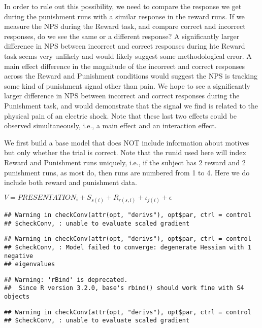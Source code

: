 \documentclass[]{article}
\begin{document}
In order to rule out this possibility, we need to compare the response
we get during the punishment runs with a similar response in the reward
runs. If we measure the NPS during the Reward task, and compare correct
and incorrect responses, do we see the same or a different response? A
significantly larger difference in NPS between incorrect and correct
responses during hte Reward task seems very unlikely and would likely
suggest some methodological error. A main effect difference in the
magnitude of the incorrect and correct responses across the Reward and
Punishment conditions would suggest the NPS is tracking some kind of
punishment signal other than pain. We hope to see a significantly larger
difference in NPS between incorrect and correct responses during the
Punishment task, and would demonstrate that the signal we find is
related to the physical pain of an electric shock. Note that these last
two effects could be observed simultaneously, i.e., a main effect and an
interaction effect.

We first build a base model that does NOT include information about
motives but only whether the trial is correct. Note that the runid used
here will index Reward and Punishment runs uniquely, i.e., if the
subject has 2 reward and 2 punishment runs, as most do, then runs are
numbered from 1 to 4. Here we do include both reward and punishment
data.

\(V=\mathit{PRESENTATION}_{i} + S_{s(i)} + R_{r(s,i)} + \iota_{j(i)} + \epsilon\)

\begin{verbatim}
## Warning in checkConv(attr(opt, "derivs"), opt$par, ctrl = control
## $checkConv, : unable to evaluate scaled gradient
\end{verbatim}

\begin{verbatim}
## Warning in checkConv(attr(opt, "derivs"), opt$par, ctrl = control
## $checkConv, : Model failed to converge: degenerate Hessian with 1 negative
## eigenvalues
\end{verbatim}

\begin{verbatim}
## Warning: 'rBind' is deprecated.
##  Since R version 3.2.0, base's rbind() should work fine with S4 objects
\end{verbatim}

\begin{verbatim}
## Warning in checkConv(attr(opt, "derivs"), opt$par, ctrl = control
## $checkConv, : unable to evaluate scaled gradient
\end{verbatim}
\end{document}
